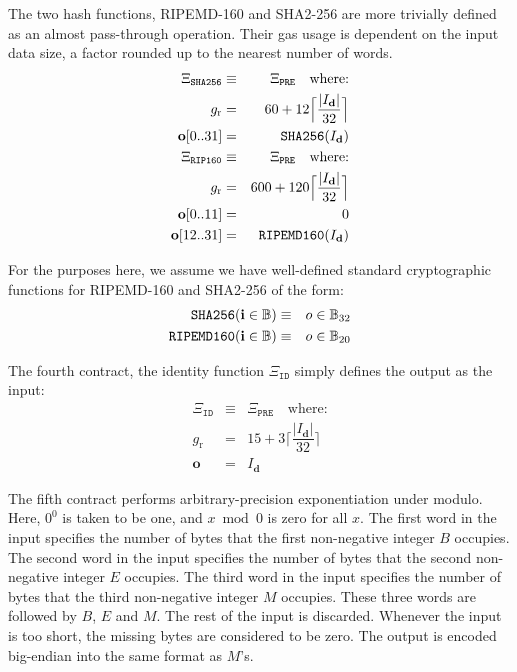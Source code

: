 \documentclass[9pt,oneside]{amsart}
\begin{document}
The two hash functions, RIPEMD-160 and SHA2-256 are more trivially defined as an almost pass-through operation. Their gas usage is dependent on the input data size, a factor rounded up to the nearest number of words.
\begin{eqnarray}
\Xi_{\mathtt{SHA256}} &\equiv& \Xi_{\mathtt{PRE}} \quad \text{where:} \\
g_{\mathrm{r}} &=& 60 + 12\Big\lceil \dfrac{|I_{\mathbf{d}}|}{32} \Big\rceil\\
\mathbf{o}[0..31] &=& \mathtt{\tiny SHA256}(I_{\mathbf{d}})\\
\Xi_{\mathtt{RIP160}} &\equiv& \Xi_{\mathtt{PRE}} \quad \text{where:} \\
g_{\mathrm{r}} &=& 600 + 120\Big\lceil \dfrac{|I_{\mathbf{d}}|}{32} \Big\rceil\\
\mathbf{o}[0..11] &=& 0 \\
\mathbf{o}[12..31] &=& \mathtt{\tiny RIPEMD160}(I_{\mathbf{d}})\\
\end{eqnarray}

For the purposes here, we assume we have well-defined standard cryptographic functions for RIPEMD-160 and SHA2-256 of the form:
\begin{eqnarray}
\mathtt{\small SHA256}(\mathbf{i} \in \mathbb{B}) & \equiv & o \in \mathbb{B}_{32} \\
\mathtt{\small RIPEMD160}(\mathbf{i} \in \mathbb{B}) & \equiv & o \in \mathbb{B}_{20}
\end{eqnarray}

The fourth contract, the identity function $\Xi_{\mathtt{ID}}$ simply defines the output as the input:
\begin{eqnarray}
\Xi_{\mathtt{ID}} &\equiv& \Xi_{\mathtt{PRE}} \quad \text{where:} \\
g_{\mathrm{r}} &=& 15 + 3\Big\lceil \dfrac{|I_{\mathbf{d}}|}{32} \Big\rceil\\
\mathbf{o} &=& I_{\mathbf{d}}
\end{eqnarray}

The fifth contract performs arbitrary-precision exponentiation under modulo. Here, $0 ^ 0$ is taken to be one, and $x \bmod 0$ is zero for all $x$. The first word in the input specifies the number of bytes that the first non-negative integer $B$ occupies. The second word in the input specifies the number of bytes that the second non-negative integer $E$ occupies. The third word in the input specifies the number of bytes that the third non-negative integer $M$ occupies. These three words are followed by $B$, $E$ and $M$. The rest of the input is discarded. Whenever the input is too short, the missing bytes are considered to be zero. The output is encoded big-endian into the same format as $M$'s.
\end{document}

